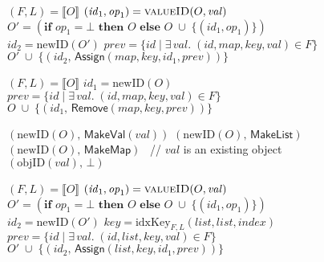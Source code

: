 \begin{figure}
\noindent
\renewcommand\algorithmicindent{10pt}
\begin{minipage}[t]{0.5\textwidth}
\begin{algorithmic}
    \State $(F,L) = \llbracket O \rrbracket$
    \State $(\mathit{id}_1, \mathit{op}_1) = \Call{valueID}{O, \mathit{val}}$
    \State $O' = (\textbf{if } \mathit{op}_1 = \bot \textbf{ then } O \textbf{ else } 
        O \;\cup\; \big\{ (\mathit{id}_1, \mathit{op}_1) \big\})$
    \State $\mathit{id}_2 = \mathrm{newID}(O')$
    \State $\mathit{prev} = \{ \mathit{id} \mid \exists\,\mathit{val}.\; (\mathit{id}, \mathit{map}, \mathit{key}, \mathit{val}) \in F \}$
    \State \Return $O' \;\cup\; \big\{ (\mathit{id}_2,\, \mathsf{Assign}(\mathit{map}, \mathit{key}, \mathit{id}_1, \mathit{prev})) \big\}$
    \EndFunction\Statex

    \State $(F,L) = \llbracket O \rrbracket$
    \State $\mathit{id}_1 = \mathrm{newID}(O)$
    \State $\mathit{prev} = \{ \mathit{id} \mid \exists\,\mathit{val}.\; (\mathit{id}, \mathit{map}, \mathit{key}, \mathit{val}) \in F \}$
    \State \Return $O \;\cup\; \big\{ (\mathit{id}_1,\, \mathsf{Remove}(\mathit{map}, \mathit{key}, \mathit{prev})) \big\}$
    \EndFunction\Statex

    \State \Return $(\mathrm{newID}(O),\, \mathsf{MakeVal}(\mathit{val}))$
    \State \Return $(\mathrm{newID}(O),\, \mathsf{MakeList})$
    \State \Return $(\mathrm{newID}(O),\, \mathsf{MakeMap})$
    \Else ~// $\mathit{val}$ is an existing object
    \State \Return $(\mathrm{objID}(\mathit{val}),\, \bot)$
    \EndIf
    \EndFunction
\end{algorithmic}
\end{minipage}%
\begin{minipage}[t]{0.5\textwidth}
\begin{algorithmic}
    \State $(F,L) = \llbracket O \rrbracket$
    \State $(\mathit{id}_1, \mathit{op}_1) = \Call{valueID}{O, \mathit{val}}$
    \State $O' = (\textbf{if } \mathit{op}_1 = \bot \textbf{ then } O \textbf{ else } 
        O \;\cup\; \big\{ (\mathit{id}_1, \mathit{op}_1) \big\})$
    \State $\mathit{id}_2 = \mathrm{newID}(O')$
    \State $\mathit{key} = \mathrm{idxKey}_{F,L}(\mathit{list}, \mathit{list}, \mathit{index})$
    \State $\mathit{prev} = \{ \mathit{id} \mid \exists\,\mathit{val}.\; (\mathit{id}, \mathit{list}, \mathit{key}, \mathit{val}) \in F \}$
    \State \Return $O' \;\cup\; \big\{ (\mathit{id}_2,\, \mathsf{Assign}(\mathit{list}, \mathit{key}, \mathit{id}_1, \mathit{prev})) \big\}$
    \EndFunction\Statex


\end{algorithmic}
\end{minipage}
\end{figure}
